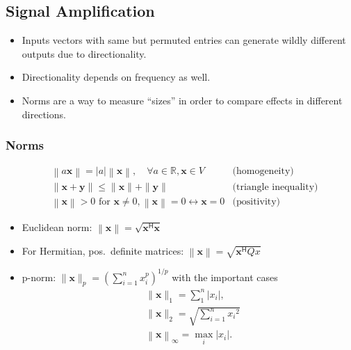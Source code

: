 \subsection{Signal Amplification}


\begin{itemize}
    \item Inputs vectors with same but permuted entries can generate wildly different outputs due to directionality.
    \item Directionality depends on frequency as well.
    \item Norms are a way to measure “sizes” in order to compare effects in different directions.
\end{itemize}

\subsubsection{Norms}

\begin{align*}
     & \left\| a\mathbf{x}\right\|  =\left|a\right|\left\|\mathbf{x}\right\|,\quad\forall a\in\mathbb{R},\mathbf{x}\in V                 & \text{(homogeneity)}         \\
     & \left\|\mathbf{x}+\mathbf{y}\right\|                         \leq\|\mathbf{x}\|+\|\mathbf{y}\|                                    & \text{(triangle inequality)} \\
     & \left\|\mathbf{x}\right\|                >0 \text{ for } \mathbf{x}\neq0, \left\|\mathbf{x}\right\|=0\leftrightarrow \mathbf{x}=0 & \text{(positivity)}
\end{align*}

\begin{itemize}
    \item Euclidean norm: $\left\|\mathbf{x}\right\|=\sqrt{\mathbf{x}^{\mathsf{H}}\mathbf{x}}$
    \item For Hermitian, pos.\ definite matrices: $\left\|\mathbf{x}\right\|=\sqrt{\mathbf{x}^{\mathsf{H}} Qx}$
    \item p-norm: $\|\mathbf{x}\|_p{=\left(\sum_{i=1}^n x_i^p\right)}^{1/p}$ with the important cases
          \begin{align*}
               & \|\mathbf{x}\|_1=\sum_1^n\left|x_i\right|,               \\
               & \|\mathbf{x}\|_2=\sqrt{\sum_{i=1}^n {x_i}^2}             \\
               & \left\|\mathbf{x}\right\|_\infty=\max_i\left|x_i\right|.
          \end{align*}
\end{itemize}


